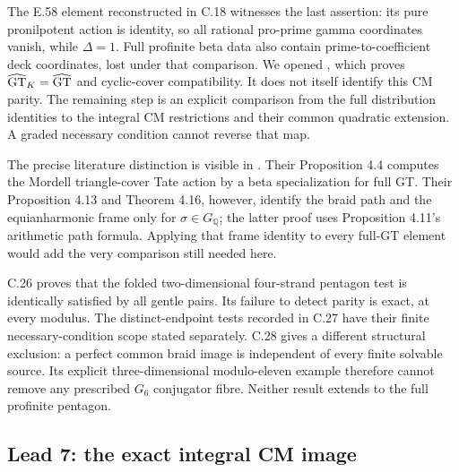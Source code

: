 The E.58 element reconstructed in C.18
witnesses the last assertion: its pure
pronilpotent action is identity, so all
rational pro-prime gamma coordinates vanish,
while \(\Delta=1\).
Full profinite beta data also contain
prime-to-coefficient deck coordinates, lost
under that comparison.
We opened \citet[Theorem 8.1 and Remark 8.6]{cEnriquez2007},
which proves \(\widehat{\rm GT}_K=\widehat{\rm GT}\)
and cyclic-cover compatibility.
It does not itself identify this CM parity.
The remaining step is an explicit comparison
from the full distribution identities to
the integral CM restrictions and their
common quadratic extension. A graded
necessary condition cannot reverse that map.

The precise literature distinction is visible in
\citet{cNakamuraTsunogaiYasuda2010}.
Their Proposition 4.4 computes the Mordell triangle-cover
Tate action by a beta specialization for full GT.
Their Proposition 4.13 and Theorem 4.16, however, identify
the braid path and the equianharmonic frame only for
\(\sigma\in G_{\mathbb Q}\); the latter proof uses
Proposition 4.11's arithmetic path formula.
Applying that frame identity to every full-GT element
would add the very comparison still needed here.

C.26 proves that the folded two-dimensional four-strand
pentagon test is identically satisfied by all gentle pairs.
Its failure to detect parity is exact, at every modulus.
The distinct-endpoint tests recorded in C.27 have their
finite necessary-condition scope stated separately.
C.28 gives a different structural exclusion: a
perfect common braid image is independent of every
finite solvable source. Its explicit three-dimensional
modulo-eleven example therefore cannot remove any
prescribed \(G_6\) conjugator fibre. Neither result
extends to the full profinite pentagon.

\subsection{Lead 7: the exact integral CM image}

